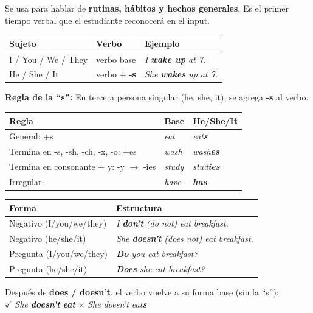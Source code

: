\documentclass[12pt,a4paper]{article}
\begin{document}
\begin{cajagrammar}
Se usa para hablar de \textbf{rutinas, hábitos y hechos generales}. Es el primer tiempo verbal que el estudiante reconocerá en el input.

\medskip
\begin{tabularx}{\textwidth}{@{} l l X @{}}
\toprule
\textbf{Sujeto} & \textbf{Verbo} & \textbf{Ejemplo} \\
\midrule
I / You / We / They & verbo base & \textit{I \textbf{wake up} at 7.} \\
He / She / It & verbo + \textbf{-s} & \textit{She \textbf{wakes} up at 7.} \\
\bottomrule
\end{tabularx}

\medskip
\textbf{Regla de la ``s'':} En tercera persona singular (he, she, it), se agrega \textbf{-s} al verbo.

\begin{cajaejemplo}
\begin{tabularx}{\textwidth}{@{} l l l @{}}
\textbf{Regla} & \textbf{Base} & \textbf{He/She/It} \\
\midrule
General: +s & \textit{eat} & \textit{eat\textbf{s}} \\
Termina en -s, -sh, -ch, -x, -o: +es & \textit{wash} & \textit{wash\textbf{es}} \\
Termina en consonante + y: -y $\rightarrow$ -ies & \textit{study} & \textit{stud\textbf{ies}} \\
Irregular & \textit{have} & \textit{\textbf{has}} \\
\end{tabularx}
\end{cajaejemplo}
\end{cajagrammar}

\begin{cajagrammar}
\begin{tabularx}{\textwidth}{@{} l X @{}}
\toprule
\textbf{Forma} & \textbf{Estructura} \\
\midrule
Negativo (I/you/we/they) & \textit{I \textbf{don't} (do not) eat breakfast.} \\
Negativo (he/she/it) & \textit{She \textbf{doesn't} (does not) eat breakfast.} \\
Pregunta (I/you/we/they) & \textit{\textbf{Do} you eat breakfast?} \\
Pregunta (he/she/it) & \textit{\textbf{Does} she eat breakfast?} \\
\bottomrule
\end{tabularx}

\medskip
\begin{cajaejemplo}
Después de \textbf{does / doesn't}, el verbo vuelve a su forma base (sin la ``s''):\\
$\checkmark$ \textit{She \textbf{doesn't} \textbf{eat}} \quad $\times$ \textit{She doesn't eat\textbf{s}}
\end{cajaejemplo}
\end{cajagrammar}
\end{document}
